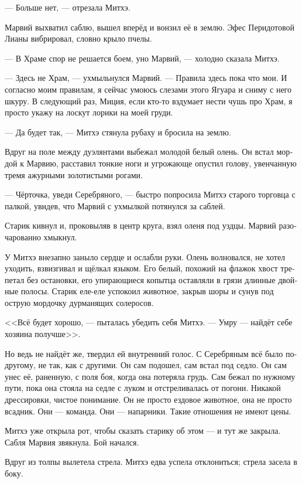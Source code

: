 \documentclass[a4paper,12pt,fleqn]{book}\usepackage{cooltooltips}\usepackage{polyglossia}\setdefaultlanguage{russian}\setotherlanguage{english}\defaultfontfeatures{Ligatures=TeX,Mapping=tex-text} \usepackage{xcolor}\definecolor{lightgray}{HTML}{bbbbbb}\color{lightgray}\newcommand{\ml}[3]{\textenglish{\textcolor{black}{#3}}}
\newcommand{\asterism}{\vspace{1em}{\centering\Large\bfseries$\ast~\ast~\ast$\par}\vspace{1em}}
\begin{document}
--- Больше нет, --- отрезала Митхэ.

Марвий выхватил саблю, вышел вперёд и вонзил её в землю.
Эфес Перидотовой Лианы вибрировал, словно крыло пчелы.

--- В Храме спор не решается боем, уно Марвий, --- холодно сказала Митхэ.

--- Здесь не Храм, --- ухмыльнулся Марвий.
--- Правила здесь пока что мои.
И согласно моим правилам, я сейчас умоюсь слезами этого Ягуара и сниму с него шкуру.
В следующий раз, Миция, если кто-то вздумает нести чушь про Храм, я просто укажу на лоскут лорики на моей груди.

--- Да будет так, --- Митхэ стянула рубаху и бросила на землю.

\asterism

Вдруг на поле между дуэлянтами выбежал молодой белый олень.
Он встал мордой к Марвию, расставил тонкие ноги и угрожающе опустил голову, увенчанную тремя ажурными золотистыми рогами.

--- Чёрточка, уведи Серебряного, --- быстро попросила Митхэ старого торговца с палкой, увидев, что Марвий с ухмылкой потянулся за саблей.

Старик кивнул и, проковыляв в центр круга, взял оленя под уздцы.
Марвий разочарованно хмыкнул.

У Митхэ внезапно заныло сердце и ослабли руки.
Олень волновался, не хотел уходить, взвизгивал и щёлкал языком.
Его белый, похожий на флажок хвост трепетал без остановки, его упирающиеся копытца оставляли в грязи длинные двойные полосы.
Старик еле-еле успокоил животное, закрыв шоры и сунув под острую мордочку дурманящих солеросов.

<<Всё будет хорошо, --- пыталась убедить себя Митхэ.
--- Умру --- найдёт себе хозяина получше>>.

Но ведь не найдёт же, твердил ей внутренний голос.
С Серебряным всё было по-другому, не так, как с другими.
Он сам подошел, сам встал под седло.
Он сам унес её, раненную, с поля боя, когда она потеряла грудь.
Сам бежал по нужному пути, пока она стояла на седле с луком и отстреливалась от погони.
Никакой дрессировки, чистое понимание.
Он не просто ездовое животное, она не просто всадник.
Они --- команда.
Они --- напарники.
Такие отношения не имеют цены.

Митхэ уже открыла рот, чтобы сказать старику об этом --- и тут же закрыла.
Сабля Марвия звякнула.
Бой начался.

\asterism

Вдруг из толпы вылетела стрела.
Митхэ едва успела отклониться;
стрела засела в боку.
\end{document}
